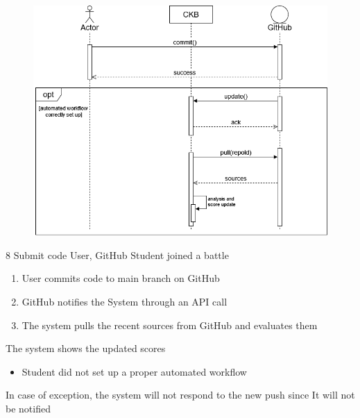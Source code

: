 \usecase
{
    {
    \begin{figure}[H]
        \centering
        \includegraphics[width=\textwidth]{src/sd_diagrams/submitcode.png}
    \end{figure}
}
}
{8}
{Submit code} %
{User, GitHub} %
{Student joined a battle} %
{ %
    \begin{enumerate}
        \item User commits code to main branch on GitHub
        \item GitHub notifies the System through an API call
        \item The system pulls the recent sources from GitHub and evaluates them
    \end{enumerate}
}
{The system shows the updated scores} %
{ %
    \begin{itemize}
        \item Student did not set up a proper automated workflow
    \end{itemize}
}
{ %
In case of exception, the system will not respond to the new push since It will not be notified
}

